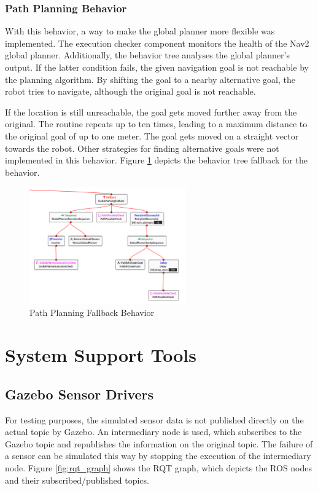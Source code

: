 \subsubsection{Path Planning Behavior}

With this behavior, a way to make the global planner more flexible was implemented. The execution checker component monitors the health of the Nav2 global planner. Additionally, the behavior tree analyses the global planner's output. If the latter condition fails, the given navigation goal is not reachable by the planning algorithm. By shifting the goal to a nearby alternative goal, the robot tries to navigate, although the original goal is not reachable. 

If the location is still unreachable, the goal gets moved further away from the original. The routine repeats up to ten times, leading to a maximum distance to the original goal of up to one meter. The goal gets moved on a straight vector towards the robot. Other strategies for finding alternative goals were not implemented in this behavior. Figure \ref{fig:global_planning_fallback} depicts the behavior tree fallback for the behavior.

\begin{figure}[ht]
	\centering
	\includegraphics[width=0.6\textwidth]{images/global_planning_fallback_inverted.png}
	\caption{Path Planning Fallback Behavior}
	\label{fig:global_planning_fallback}
\end{figure}

\section{System Support Tools}
\subsection{Gazebo Sensor Drivers}
\label{subsec:gazebo_driver}

For testing purposes, the simulated sensor data is not published directly on the actual topic by Gazebo. An intermediary node is used, which subscribes to the Gazebo topic and republishes the information on the original topic. The failure of a sensor can be simulated this way by stopping the execution of the intermediary node. Figure \ref{fig:rqt_graph} shows the RQT graph, which depicts the ROS nodes and their subscribed/published topics. 

